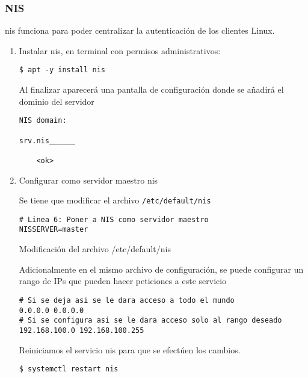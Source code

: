 \documentclass[../main.tex]{subfiles}
\begin{document}
\subsubsection{NIS}\label{sec:nis}

\acrshort{nis} funciona para poder centralizar la autenticación de los clientes Linux.

\begin{enumerate}
  \item Instalar \acrshort{nis}, en terminal con permisos administrativos:
        \begin{listing}[H]
\begin{verbatim}
$ apt -y install nis
\end{verbatim}
\end{listing}

        Al finalizar aparecerá una pantalla de configuración donde se
        añadirá el dominio del servidor
        \begin{listing}[H]
\begin{verbatim}
NIS domain:

srv.nis______

    <ok>
\end{verbatim}
\end{listing}

  \item Configurar como servidor maestro \acrshort{nis}

        Se tiene que modificar el archivo \texttt{/etc/default/nis}
        \begin{listing}[H]
\begin{verbatim}
# Linea 6: Poner a NIS como servidor maestro
NISSERVER=master
\end{verbatim}
    \caption{Modificación del archivo /etc/default/nis}
    \label{listing:nis}
\end{listing}

        Adicionalmente en el mismo archivo de configuración, se puede
        configurar un rango de IPs que pueden hacer peticiones
        a este servicio
        \begin{listing}[H]
\begin{verbatim}
# Si se deja asi se le dara acceso a todo el mundo
0.0.0.0 0.0.0.0
# Si se configura asi se le dara acceso solo al rango deseado
192.168.100.0 192.168.100.255
\end{verbatim}
\end{listing}

        Reiniciamos el servicio nis para que se efectúen los cambios.
        \begin{listing}[H]
\begin{verbatim}
$ systemctl restart nis
\end{verbatim}
\end{listing}



\end{enumerate}
\end{document}
